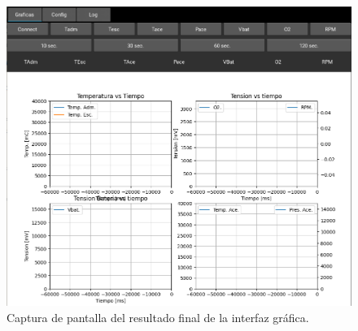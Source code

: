 \begin{figure}[htpb]
\centering
\includegraphics[width=.9\textwidth]{./Figures/gui.png}
\caption{Captura de pantalla del resultado final de la interfaz gráfica.}
\label{fig:gui}
\end{figure}


